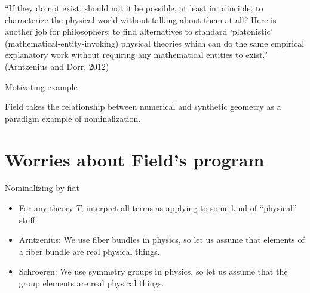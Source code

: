 \documentclass{beamer}
\begin{document}
\begin{frame}

  ``If they do not exist, should not it be possible, at least in
  principle, to characterize the physical world without talking about
  them at all? Here is another job for philosophers: to find
  alternatives to standard `platonistic'
  (mathematical-entity-invoking) physical theories which can do the
  same empirical explanatory work without requiring any mathematical
  entities to exist.'' (Arntzenius and Dorr, 2012)

\end{frame}

\begin{frame}{Motivating example}

  Field takes the relationship between numerical and synthetic
  geometry as a paradigm example of nominalization.


\end{frame}

\section{Worries about Field's program}

\begin{frame}{Nominalizing by fiat}

  \begin{itemize}
  \item For any theory $T$, interpret all terms as applying to some
    kind of ``physical'' stuff.
  \item Arntzenius: We use fiber bundles in physics, so let us assume
    that elements of a fiber bundle are real physical things.
  \item Schroeren: We use symmetry groups in physics, so let us assume
    that the group elements are real physical things.
  \end{itemize}

\end{frame}
\end{document}
